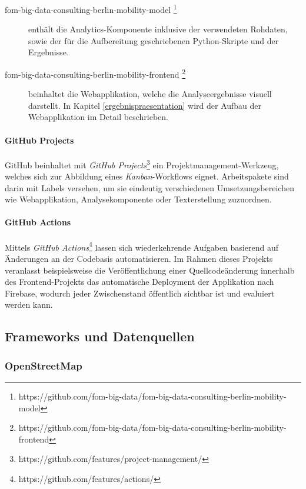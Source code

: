 \begin{description}
    \item[fom-big-data-consulting-berlin-mobility-model \footnote{https://github.com/fom-big-data/fom-big-data-consulting-berlin-mobility-model}]enthält die Analytics-Komponente inklusive der verwendeten Rohdaten, sowie der für die Aufbereitung geschriebenen Python-Skripte und der Ergebnisse.
    \item[fom-big-data-consulting-berlin-mobility-frontend \footnote{https://github.com/fom-big-data/fom-big-data-consulting-berlin-mobility-frontend}] beinhaltet die Webapplikation, welche die Analyseergebnisse visuell darstellt. In Kapitel \ref{ergebnispraesentation} wird der Aufbau der Webapplikation im Detail beschrieben.
\end{description}

\paragraph*{GitHub Projects}
\label{github_projects}

GitHub beinhaltet mit \emph{GitHub Projects}\footnote{https://github.com/features/project-management/} ein Projektmanagement-Werkzeug, welches sich zur Abbildung eines \emph{Kanban}-Workflows eignet. Arbeitspakete sind darin mit Labels versehen, um sie eindeutig verschiedenen Umsetzungsbereichen wie Webapplikation, Analysekomponente oder Texterstellung zuzuordnen.

\paragraph*{GitHub Actions}
\label{github_actions}

Mittels \emph{GitHub Actions}\footnote{https://github.com/features/actions/} lassen sich wiederkehrende Aufgaben basierend auf Änderungen an der Codebasis automatisieren. Im Rahmen dieses Projekts veranlasst beispielsweise die Veröffentlichung einer Quellcodeänderung innerhalb des Frontend-Projekts das automatische Deployment der Applikation nach Firebase, wodurch jeder Zwischenstand öffentlich sichtbar ist und evaluiert werden kann.

\subsection{Frameworks und Datenquellen}
\label{frameworks_und_datenquellen}

\subsubsection{OpenStreetMap}
\label{open_street_map}

